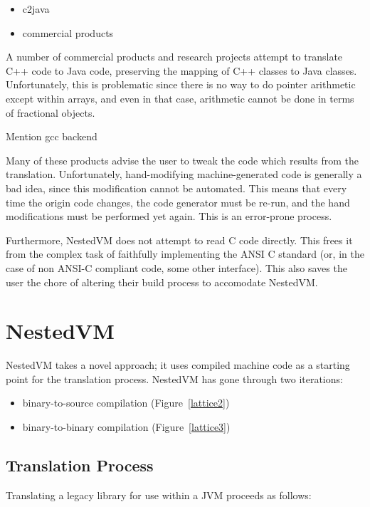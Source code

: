 \documentclass{acmconf}
\begin{document}
\begin{itemize}
\item c2java
\item commercial products
\end{itemize}

A number of commercial products and research projects attempt to
translate C++ code to Java code, preserving the mapping of C++ classes
to Java classes.  Unfortunately, this is problematic since there is no
way to do pointer arithmetic except within arrays, and even in that
case, arithmetic cannot be done in terms of fractional objects.

Mention gcc backend

Many of these products advise the user to tweak the code which results
from the translation.  Unfortunately, hand-modifying machine-generated
code is generally a bad idea, since this modification cannot be
automated.  This means that every time the origin code changes, the
code generator must be re-run, and the hand modifications must be
performed yet again.  This is an error-prone process.

Furthermore, NestedVM does not attempt to read C code directly.  This
frees it from the complex task of faithfully implementing the ANSI C
standard (or, in the case of non ANSI-C compliant code, some other
interface).  This also saves the user the chore of altering their
build process to accomodate NestedVM.

\section{NestedVM}

NestedVM takes a novel approach; it uses compiled machine code as a
starting point for the translation process.  NestedVM has gone through
two iterations:

\begin{itemize}
\item binary-to-source compilation  (Figure~\ref{lattice2})
\item binary-to-binary compilation  (Figure~\ref{lattice3})
\end{itemize}

\subsection{Translation Process}

Translating a legacy library for use within a JVM proceeds as follows:
\end{document}
